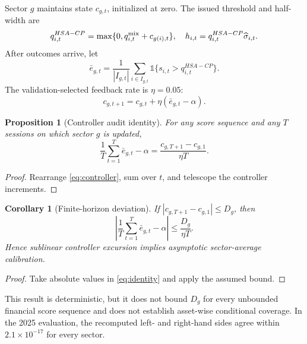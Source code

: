 \documentclass[conference]{IEEEtran}
\newcommand{\method}{HSA-CP}
\newtheorem{proposition}{Proposition}
\newtheorem{corollary}{Corollary}
\begin{document}
Sector $g$ maintains state $c_{g,t}$, initialized at zero. The issued threshold and half-width are
\begin{equation}
 q^{\method}_{i,t}=\max\{0,q^{\rm mix}_{i,t}+c_{g(i),t}\},\quad
 h_{i,t}=q^{\method}_{i,t}\widehat\sigma_{i,t}.
 \label{eq:finalq}
\end{equation}
After outcomes arrive, let
\begin{equation}
 \bar e_{g,t}=\frac{1}{|I_{g,t}|}\sum_{i\in I_{g,t}}
 \mathbb 1\{s_{i,t}>q^{\method}_{i,t}\}.
\end{equation}
The validation-selected feedback rate is $\eta=0.05$:
\begin{equation}
 c_{g,t+1}=c_{g,t}+\eta(\bar e_{g,t}-\alpha).
 \label{eq:controller}
\end{equation}

\begin{proposition}[Controller audit identity]
For any score sequence and any $T$ sessions on which sector $g$ is updated,
\begin{equation}
 \frac1T\sum_{t=1}^{T}\bar e_{g,t}-\alpha
 =\frac{c_{g,T+1}-c_{g,1}}{\eta T}.
 \label{eq:identity}
\end{equation}
\end{proposition}
\begin{proof}
Rearrange \eqref{eq:controller}, sum over $t$, and telescope the controller increments.
\end{proof}

\begin{corollary}[Finite-horizon deviation]
If $|c_{g,T+1}-c_{g,1}|\leq D_g$, then
\begin{equation}
 \left|\frac1T\sum_{t=1}^{T}\bar e_{g,t}-\alpha\right|
 \leq\frac{D_g}{\eta T}.
\end{equation}
Hence sublinear controller excursion implies asymptotic sector-average calibration.
\end{corollary}
\begin{proof}
Take absolute values in \eqref{eq:identity} and apply the assumed bound.
\end{proof}
This result is deterministic, but it does not bound $D_g$ for every unbounded financial score sequence and does not establish asset-wise conditional coverage. In the 2025 evaluation, the recomputed left- and right-hand sides agree within $2.1\times10^{-17}$ for every sector.
\end{document}
